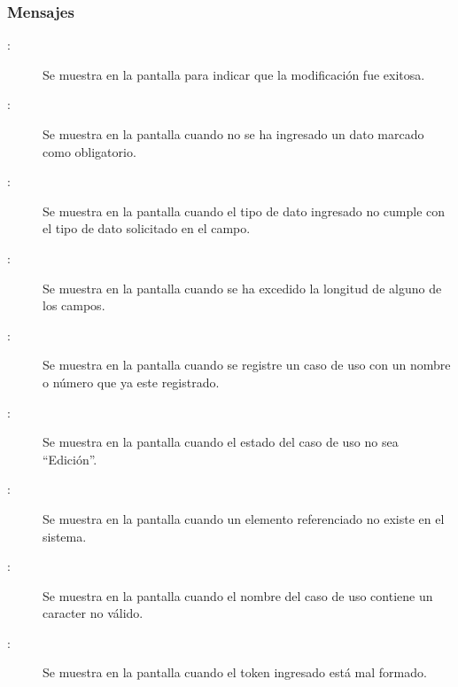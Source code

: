 \subsubsection{Mensajes}

	
\begin{description}
			\item[:] Se muestra en la pantalla  para indicar que la modificación fue exitosa.
	
			\item[:] Se muestra en la pantalla  cuando no se ha ingresado un dato marcado como obligatorio.
			\item[:] Se muestra en la pantalla  cuando el tipo de dato ingresado no cumple con el tipo de dato solicitado en el campo.
			\item[:] Se muestra en la pantalla  cuando se ha excedido la longitud de alguno de los campos.
			\item[:] Se muestra en la pantalla  cuando se registre un caso de uso con un nombre o número que ya este registrado.
			\item[:] Se muestra en la pantalla  cuando el estado del caso de uso no sea ``Edición''.
			\item[:] Se muestra en la pantalla  cuando un elemento referenciado no existe en el sistema.
			\item[:] Se muestra en la pantalla  cuando el nombre del caso de uso contiene un caracter no válido.
			\item[:] Se muestra en la pantalla  cuando el token ingresado está mal formado.
\end{description}
